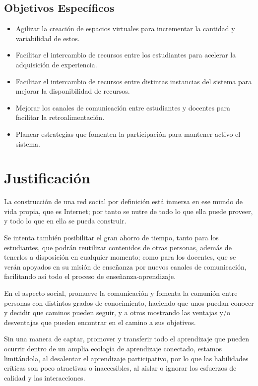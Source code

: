 \subsection{Objetivos Específicos}
\begin{itemize}
\item Agilizar la creación de espacios virtuales para incrementar la cantidad y
variabilidad de estos.
\item Facilitar el intercambio de recursos entre los estudiantes para acelerar
la adquisición de experiencia.
\item Facilitar el intercambio de recursos entre distintas instancias del
sistema para mejorar la disponibilidad de recursos.
\item Mejorar los canales de comunicación entre estudiantes y docentes para
facilitar la retroalimentación.
\item Planear estrategias que fomenten la participación para mantener activo el
sistema.
\end{itemize}

\section{Justificación}
La construcción de una red social por definición está inmersa en ese mundo de
vida propia, que es Internet; por tanto se nutre de todo lo que ella puede
proveer, y todo lo que en ella se pueda construir.

Se intenta también posibilitar el gran ahorro de tiempo, tanto para los
estudiantes, que podrán reutilizar contenidos de otras personas, además de
tenerlos a disposición en cualquier momento; como para los docentes, que se
verán apoyados en su misión de enseñanza por nuevos canales de comunicación,
facilitando así todo el proceso de enseñanza-aprendizaje.

En el aspecto social, promueve la comunicación y fomenta la comunión entre
personas con distintos grados de conocimiento, haciendo que unos puedan conocer
y decidir que caminos pueden seguir, y a otros mostrando las ventajas y/o
desventajas que pueden encontrar en el camino a sus objetivos.

Sin una manera de captar, promover y transferir todo el aprendizaje que pueden
ocurrir dentro de un amplia ecología de aprendizaje conectado, estamos
limitándola, al desalentar el aprendizaje participativo, por lo que las
habilidades críticas son poco atractivas o inaccesibles, al aislar o ignorar
los esfuerzos de calidad y las interacciones\cite{Santamaria}.

